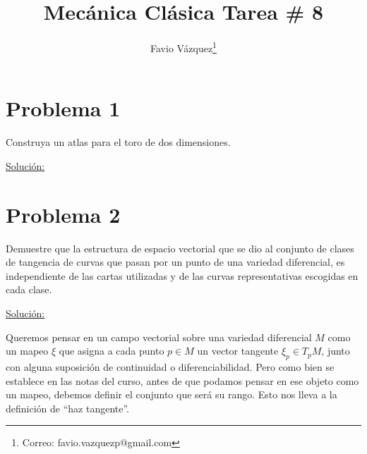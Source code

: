 \documentclass[a4paper,10pt]{article}
\title{Mecánica Clásica Tarea \# 8}
\author{Favio Vázquez\thanks{Correo: favio.vazquezp@gmail.com}}\affil{Instituto de Ciencias Nucleares. Universidad Nacional Autónoma de México.}
\date{}
\numberwithin{equation}{section}
\begin{document}
\makeatletter
\def\@maketitle{%
  \newpage
  \null
  \vskip 2em%
  \begin{center}%
  \let \footnote \thanks
    {\Large\bfseries \@title \par}%
    \vskip 1.5em%
    {\normalsize
      \lineskip .5em%
      \begin{tabular}[t]{c}%
        \@author
      \end{tabular}\par}%
    \vskip 1em%
    {\normalsize \@date}%
  \end{center}%
  \par
  \vskip 1.5em}
\makeatother

\maketitle

\section{Problema 1}

Construya un atlas para el toro de dos dimensiones.

\vspace{.3cm}

\underline{Solución:} \vspace{.3cm}

\section{Problema 2}

Demuestre que la estructura de espacio vectorial que se dio al conjunto de clases de 
tangencia de curvas que pasan por un punto de una variedad diferencial, es independiente 
de las cartas utilizadas y de las curvas representativas escogidas en cada clase.

\vspace{.3cm}

\underline{Solución:} \vspace{.3cm}

Queremos pensar en un campo vectorial sobre una variedad diferencial $M$ como un 
mapeo $\xi$ que asigna a cada punto $p \in M$ un vector tangente $\xi_p \in T_p M$, 
junto con alguna suposición de continuidad o diferenciabilidad. Pero como bien 
se establece en las notas del curso, antes de que podamos pensar en ese objeto 
como un mapeo, debemos definir el conjunto que será su rango. Esto nos lleva a la 
definición de ``haz tangente''.
\end{document}
